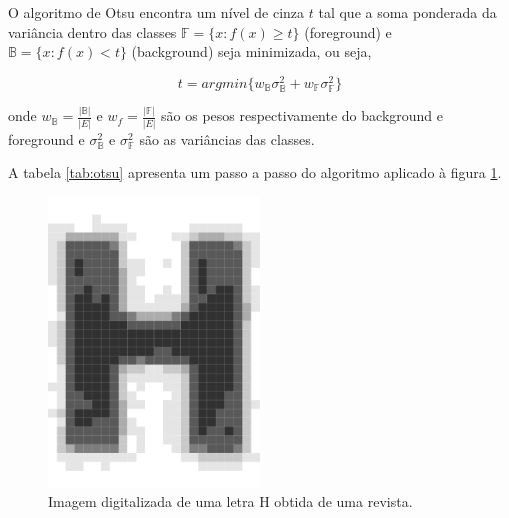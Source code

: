 \documentclass[a4paper,11pt]{article}
\begin{document}
      O algoritmo de Otsu encontra um nível de cinza $t$ tal que a soma ponderada da variância dentro das classes $\mathbb{F} = \{ x \colon f(x) \geq t \}$ (foreground) e $\mathbb{B} = \{ x \colon f(x) < t \}$ (background) seja minimizada, ou seja,

      \begin{equation}
        t = argmin \{ w_\mathbb{B} \sigma^{2}_{\mathbb{B}} + w_\mathbb{F} \sigma^{2}_{\mathbb{F}} \}
      \end{equation}

      onde $w_\mathbb{B} = \frac{|\mathbb{B}|}{|E|}$ e $w_f = \frac{|\mathbb{F}|}{|E|}$ são os pesos respectivamente do background e foreground e $\sigma^{2}_{\mathbb{B}}$ e $\sigma^{2}_{\mathbb{F}}$ são as variâncias das classes.

      A tabela \ref{tab:otsu} apresenta um passo a passo do algoritmo aplicado à figura \ref{fig:letrah}.

      \begin{figure}[htb]
        \begin{center}
          \includegraphics[width=0.5\textwidth]{assets/binarization/h_3grayscale_big.png}
          \end{center}
        \caption{Imagem digitalizada de uma letra H obtida de uma revista.}
        \label{fig:letrah}
      \end{figure}
\end{document}
